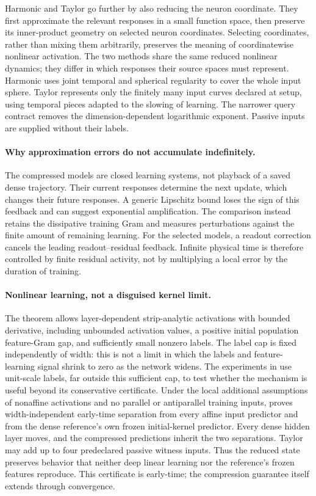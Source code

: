 \documentclass[11pt]{article}
\theoremstyle{definition}
\theoremstyle{remark}
\begin{document}
Harmonic and Taylor go further by also reducing the neuron coordinate.
They first approximate the relevant responses in a small function space, then
preserve its inner-product geometry on selected neuron coordinates. Selecting
coordinates, rather than mixing them arbitrarily, preserves the meaning of
coordinatewise nonlinear activation. The two methods share the same reduced
nonlinear dynamics; they differ in which responses their source spaces must
represent. Harmonic uses joint temporal and spherical regularity to cover the
whole input sphere. Taylor represents only the finitely many input curves
declared at setup, using temporal pieces adapted to the slowing of learning.
The narrower query contract removes the dimension-dependent logarithmic
exponent. Passive inputs are supplied without their labels.

\paragraph{Why approximation errors do not accumulate indefinitely.}
The compressed models are closed learning systems, not playback of a saved
dense trajectory. Their current responses determine the next update, which
changes their future responses. A generic Lipschitz bound loses the sign of
this feedback and can suggest exponential amplification. The comparison
instead retains the dissipative training Gram and measures perturbations
against the finite amount of remaining learning. For the selected models,
a readout correction cancels the leading readout--residual feedback.
Infinite physical time is therefore controlled by finite residual activity,
not by multiplying a local error by the duration of training.

\paragraph{Nonlinear learning, not a disguised kernel limit.}
The theorem allows layer-dependent strip-analytic activations with bounded
derivative, including unbounded activation values, a positive initial
population feature-Gram gap, and sufficiently small nonzero labels. The label
cap is fixed independently of width: this is not a limit in which the labels
and feature-learning signal shrink to zero as the network widens.
The experiments in  use unit-scale labels, far outside
this sufficient cap, to test whether the mechanism is useful beyond its
conservative certificate.
Under the local additional assumptions of nonaffine activations and no
parallel or antiparallel training inputs, 
proves width-independent early-time separation from every affine input
predictor and from the dense reference's own frozen initial-kernel predictor.
Every dense hidden layer moves, and the compressed predictions inherit the
two separations. Taylor may add up to four predeclared passive witness inputs.
Thus the reduced state preserves behavior that neither deep linear learning
nor the reference's frozen features reproduce. This certificate is early-time;
the compression guarantee itself extends through convergence.
\end{document}
